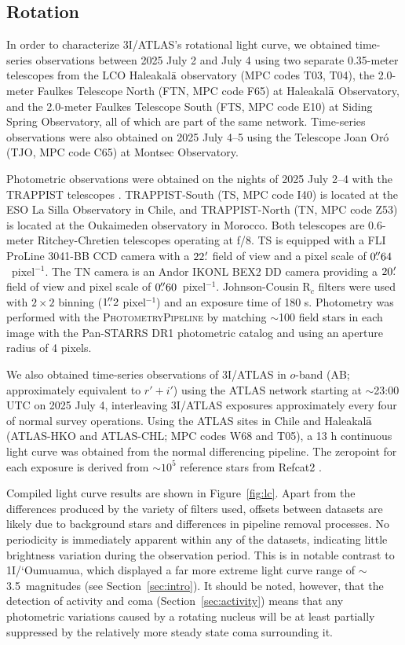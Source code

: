 \documentclass[linenumbers,twocolumn,longbib]{aastex7}
\begin{document}
\subsection{Rotation}\label{sec:rotation}

In order to characterize 3I/ATLAS's rotational light curve, we obtained time-series observations between 2025 July 2 and July 4 using two separate 0.35-meter telescopes from the LCO Haleakal${\rm\bar{a}}$ observatory (MPC codes T03, T04), the 2.0-meter Faulkes Telescope North (FTN, MPC code F65) at Haleakal${\rm\bar{a}}$ Observatory, and the 2.0-meter Faulkes Telescope South (FTS, MPC code E10) at Siding Spring Observatory, all of which are part of the same network.  Time-series observations were also obtained on 2025 July 4--5 using the Telescope Joan Or\'{o} (TJO, MPC code C65) at Montsec Observatory.

Photometric observations were obtained on the nights of 2025 July 2--4 with the TRAPPIST telescopes \citep{jehin2011trappist}. TRAPPIST-South (TS, MPC code I40) is located at the ESO La Silla Observatory in Chile, and TRAPPIST-North (TN, MPC code Z53) is located at the Oukaimeden observatory in Morocco. Both telescopes are 0.6-meter Ritchey-Chretien telescopes operating at f/8. TS is equipped with a FLI ProLine 3041-BB CCD camera with a $22\mbox{$.\mkern-4mu^\prime$}$ field of view and a pixel scale of $0\mbox{$.\!\!^{\prime\prime}$}64$~pixel$^{-1}$. The TN camera is an Andor IKONL BEX2 DD camera providing a $20\mbox{$.\mkern-4mu^\prime$}$ field of view and pixel scale of $0\mbox{$.\!\!^{\prime\prime}$}60$~pixel$^{-1}$. Johnson-Cousin R$_c$ filters were used with $2\times2$ binning ($1\mbox{$.\!\!^{\prime\prime}$}2$ pixel$^{-1}$) and an exposure time of 180 s.  Photometry was performed with the \textsc{PhotometryPipeline} \citep{mommert2017photometrypipeline} by matching $\sim$100 field stars in each image with the Pan-STARRS DR1 photometric catalog and using an aperture radius of 4 pixels.


We also obtained time-series observations of 3I/ATLAS in $o$-band (AB; approximately equivalent to $r'+i'$) using the ATLAS network starting at $\sim$23:00 UTC on 2025 July 4, interleaving 3I/ATLAS exposures approximately every four of normal survey operations.  Using the ATLAS sites in Chile and Haleakal${\rm\bar{a}}$ (ATLAS-HKO and ATLAS-CHL; MPC codes W68 and T05), a 13 h continuous light curve was obtained from the normal differencing pipeline. The zeropoint for each exposure is derived from $\sim10^5$ reference stars from Refcat2 \citep{Tonry2018b}.

Compiled light curve results are shown in Figure~\ref{fig:lc}.
Apart from the differences produced by the variety of filters used, offsets between datasets are likely due to background stars and differences in pipeline removal processes. No periodicity is immediately apparent within any of the datasets, indicating little brightness variation during the observation period.
This is in notable contrast to 1I/`Oumuamua, which displayed a far more extreme light curve range of $\sim$ 3.5~magnitudes (see Section~\ref{sec:intro}). It should be noted, however, that the detection of activity and coma (Section~\ref{sec:activity}) means that any photometric variations caused by a rotating nucleus will be at least partially suppressed by the relatively more steady state coma surrounding it.
\end{document}
